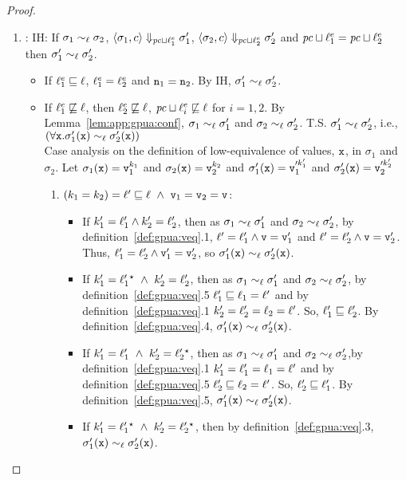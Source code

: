 \begin{proof}
\begin{enumerate}
 \item {}: IH: If $\sigma_1 \sim_\ell \sigma_2$, $ \langle 
   \sigma_1, c  \rangle \Downarrow_{\mathit{pc} \sqcup \ell^e_1} \sigma_1'$, $  \langle 
   \sigma_2, c \rangle \Downarrow_{\mathit{pc} \sqcup \ell^e_2} \sigma_2'$ and
   $\mathit{pc} \sqcup \ell^e_1 = \mathit{pc} \sqcup \ell^e_2$ then $\sigma_1'
   \sim_\ell \sigma_2'$. 
   \begin{itemize}
     \item If $\ell^e_1 \sqsubseteq \ell$, $\ell^e_1 = \ell^e_2$ and $\texttt{n}_1 =
   \texttt{n}_2$. By IH, $\sigma_1' \sim_\ell \sigma_2'$.
   \item If $\ell^e_1 \not\sqsubseteq \ell$, then $\ell^e_2
     \not\sqsubseteq \ell$, $\mathit{pc} \sqcup \ell^e_i \not\sqsubseteq
   \ell$ for $i =1,2$. By Lemma~\ref{lem:app:gpua:conf}, $\sigma_1 \sim_\ell \sigma_1'$ and $\sigma_2
   \sim_\ell \sigma_2'$.
   T.S. $\sigma_1' \sim_\ell \sigma_2'$, i.e., $(\forall \texttt{x}. \sigma_1'(\texttt{x}) \sim_\ell \sigma_2'(\texttt{x}))$\\
   Case analysis on the definition of low-equivalence of values, $\texttt{x}$, in $\sigma_1$ and
$\sigma_2$. Let $\sigma_1(\texttt{x}) = \texttt{v}_1^{k_1}$ and $\sigma_2(\texttt{x}) =
\texttt{v}_2^{k_2}$ and $\sigma_1'(\texttt{x}) = \texttt{v}_1'^{k_1'}$ and $\sigma_2'(\texttt{x}) =
\texttt{v}_2'^{k_2'}$
\begin{enumerate}
\item $(k_1 = k_2) = \ell' \sqsubseteq \ell ~\wedge~\texttt{v}_1 = \texttt{v}_2 = \texttt{v}$:
 \begin{itemize}
\item   If $k_1' = \ell_1' \wedge k_2' = \ell_2'$, then as $\sigma_1
  \sim_\ell \sigma_1'$ and $\sigma_2 \sim_\ell \sigma_2'$, by
  definition~\ref{def:gpua:veq}.1, $\ell' = \ell_1' \wedge \texttt{v} = \texttt{v}_1'$ and
  $\ell' = \ell_2' \wedge \texttt{v} = \texttt{v}_2'$. Thus, $\ell_1' = \ell_2' \wedge
  \texttt{v}_1' = \texttt{v}_2'$, so $\sigma_1'(\texttt{x})  \sim_\ell \sigma_2'(\texttt{x})$.
\item  If $k_1' =  \ell_1'{}^\star   ~\wedge~k_2' = \ell_2'$, then as $\sigma_1
  \sim_\ell \sigma_1'$ and $\sigma_2 \sim_\ell \sigma_2'$, by
  definition~\ref{def:gpua:veq}.5 $\ell_1' \sqsubseteq \ell_1 = \ell'$ and by
  definition~\ref{def:gpua:veq}.1 
  $k_2' = \ell_2' =\ell_2 = \ell'$. So, $\ell_1' \sqsubseteq \ell_2'$.
  By definition~\ref{def:gpua:veq}.4, $\sigma_1'(\texttt{x})
  \sim_\ell \sigma_2'(\texttt{x})$.
\item If $k_1' = \ell_1' ~\wedge~k_2' =  \ell_2'{}^\star  $, then as $\sigma_1
  \sim_\ell \sigma_1'$ and $\sigma_2 \sim_\ell \sigma_2'$,by
  definition~\ref{def:gpua:veq}.1 $k_1' = \ell_1' =\ell_1 = \ell'$ and by
  definition~\ref{def:gpua:veq}.5 $\ell_2' \sqsubseteq \ell_2 = \ell'$. So,
  $\ell_2' \sqsubseteq \ell_1'$. 
  By definition~\ref{def:gpua:veq}.5, $\sigma_1'(\texttt{x})
  \sim_\ell \sigma_2'(\texttt{x})$.
\item If $k_1' =  \ell_1'{}^\star   ~\wedge~k_2' =
 \ell_2'{}^\star  $, then by definition~\ref{def:gpua:veq}.3,
$\sigma_1'(\texttt{x})   \sim_\ell \sigma_2'(\texttt{x})$.
 \end{itemize}


\end{enumerate}
\end{itemize}
\end{enumerate}
\end{proof}

